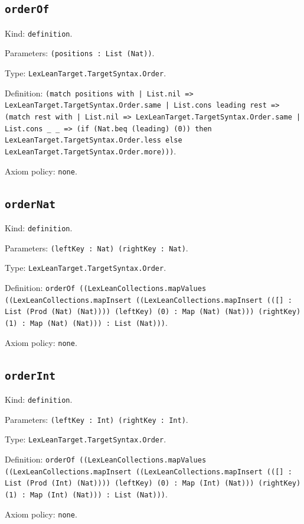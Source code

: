 \documentclass[11pt]{article}
\begin{document}
\subsection*{\texttt{orderOf}}
\noindent Kind: \texttt{definition}.\par
\noindent Parameters: \texttt{(positions : List (Nat))}.\par
\noindent Type: \texttt{LexLeanTarget.TargetSyntax.Order}.\par
\noindent Definition: \texttt{(match positions with | List.nil => LexLeanTarget.TargetSyntax.Order.same | List.cons leading rest => (match rest with | List.nil => LexLeanTarget.TargetSyntax.Order.same | List.cons \_ \_ => (if (Nat.beq (leading) (0)) then LexLeanTarget.TargetSyntax.Order.less else LexLeanTarget.TargetSyntax.Order.more)))}.\par
\noindent Axiom policy: \texttt{none}.\par
\subsection*{\texttt{orderNat}}
\noindent Kind: \texttt{definition}.\par
\noindent Parameters: \texttt{(leftKey : Nat) (rightKey : Nat)}.\par
\noindent Type: \texttt{LexLeanTarget.TargetSyntax.Order}.\par
\noindent Definition: \texttt{orderOf ((LexLeanCollections.mapValues ((LexLeanCollections.mapInsert ((LexLeanCollections.mapInsert (([] : List (Prod (Nat) (Nat)))) (leftKey) (0) : Map (Nat) (Nat))) (rightKey) (1) : Map (Nat) (Nat))) : List (Nat)))}.\par
\noindent Axiom policy: \texttt{none}.\par
\subsection*{\texttt{orderInt}}
\noindent Kind: \texttt{definition}.\par
\noindent Parameters: \texttt{(leftKey : Int) (rightKey : Int)}.\par
\noindent Type: \texttt{LexLeanTarget.TargetSyntax.Order}.\par
\noindent Definition: \texttt{orderOf ((LexLeanCollections.mapValues ((LexLeanCollections.mapInsert ((LexLeanCollections.mapInsert (([] : List (Prod (Int) (Nat)))) (leftKey) (0) : Map (Int) (Nat))) (rightKey) (1) : Map (Int) (Nat))) : List (Nat)))}.\par
\noindent Axiom policy: \texttt{none}.\par
\end{document}
